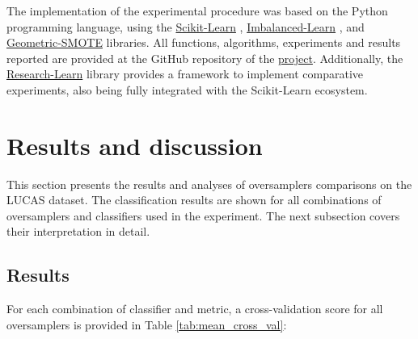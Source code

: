 \documentclass[remotesensing,article,submit,moreauthors,pdftex]{Definitions/mdpi}
\begin{document}
The implementation of the experimental procedure was based on the Python
programming language, using the
\href{https://scikit-learn.org/stable/}{Scikit-Learn} \cite{Pedregosa2011},
\href{https://imbalanced-learn.org/en/stable/}{Imbalanced-Learn} \cite{JMLR:v18:16-365},
and
\href{https://geometric-smote.readthedocs.io/en/latest/?badge=latest}{Geometric-SMOTE}
libraries. All functions, algorithms, experiments and results reported are
provided at the GitHub repository of the
\href{https://github.com/AlgoWit/publications/tree/master/remote-sensing-lucas}{project}.
Additionally, the
\href{https://research-learn.readthedocs.io/en/latest/?badge=latest}{Research-Learn}
library provides a framework to implement comparative experiments, also being
fully integrated with the Scikit-Learn ecosystem.

\section{Results and discussion}

This section presents the results and analyses of oversamplers comparisons on the
LUCAS dataset. The classification results are shown for all
combinations of oversamplers and classifiers used in the experiment. The next subsection
covers their interpretation in detail.

\subsection{Results}

For each combination of classifier and metric, a cross-validation score for all
oversamplers is provided in Table \ref{tab:mean_cross_val}:

\end{document}
